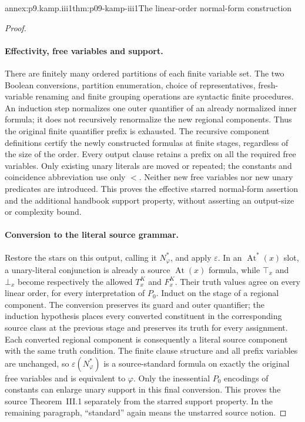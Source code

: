 \begin{annexitem}{annex:p9.kamp.iii1}{thm:p09-kamp-iii1}{The linear-order normal-form construction}
\begin{proof}
\paragraph{Effectivity, free variables and support.}
There are finitely many ordered partitions of each finite variable set.
The two Boolean conversions, partition enumeration, choice of representatives,
fresh-variable renaming and finite grouping operations are syntactic finite
procedures.  An induction step normalizes one outer quantifier of an already
normalized inner formula; it does not recursively renormalize the new
regional components.  Thus the original finite quantifier prefix is
exhausted.  The recursive component definitions certify the newly constructed
formulas at finite stages, regardless of the size of the order.
Every output clause retains a prefix on all the required free variables.
Only existing unary literals are moved or repeated; the constants and
coincidence abbreviation use only \(<\).  Neither new free variables nor
new unary predicates are introduced.  This proves the effective starred
normal-form assertion and the additional handbook support property, without
asserting an output-size or complexity bound.

\paragraph{Conversion to the literal source grammar.}
Restore the stars on this output, calling it \(N^*_{\varphi}\), and
apply \(\varepsilon\).  In an \(\operatorname{At}^{*}(x)\) slot,
a unary-literal conjunction is already a source \(\operatorname{At}(x)\)
formula, while \(\top_x\) and \(\bot_x\) become respectively the
allowed \(T^K_x\) and \(F^K_x\).  Their truth values agree on every
linear order, for every interpretation of \(P_0\).
Induct on the stage of a regional component.  The conversion preserves its
guard and outer quantifier; the induction hypothesis places every converted
constituent in the corresponding source class at the previous stage and
preserves its truth for every assignment.  Each converted regional component
is consequently a literal source component with the same truth condition.
The finite clause structure and all prefix variables are unchanged, so
\(\varepsilon(N^*_{\varphi})\) is a source-standard formula on exactly
the original free variables and is equivalent to \(\varphi\).
Only the inessential \(P_0\) encodings of constants can enlarge unary
support in this final conversion.  This proves the source Theorem~III.1
separately from the starred support property.  In the remaining paragraph,
``standard'' again means the unstarred source notion.


\end{proof}
\end{annexitem}
